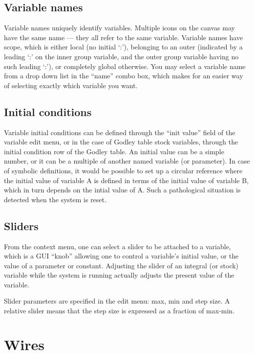 \subsection{Variable names}

Variable names uniquely identify variables. Multiple icons on the
canvas may have the same name --- they all refer to the same
variable. Variable names have scope, which is either local (no initial
`:'), belonging to an outer  (indicated by a leading `:' on the
inner group variable, and the outer group variable having no such
leading `:'), or completely global otherwise. You may select a
variable name from a drop down list in the ``name'' combo box, which
makes for an easier way of selecting exactly which variable you want.

\subsection{Initial conditions}\label{var:init}

Variable initial conditions can be defined through the ``init value''
field of the variable edit menu, or in the case of Godley table stock
variables, through the initial condition row of the Godley table. An
initial value can be a simple number, or it can be a multiple of
another named variable (or parameter). In case of symbolic
definitions, it would be possible to set up a circular reference where
the initial value of variable A is defined in terms of the initial
value of variable B, which in turn depends on the intial value of
A. Such a pathological situation is detected when the system is reset.

\subsection{Sliders}

From the context menu, one can select a slider to be attached to a
variable, which is a GUI ``knob'' allowing one to control a variable's
initial value, or the value of a parameter or constant. Adjusting the
slider of an integral (or stock) variable while the system is running
actually adjusts the present value of the variable.

Slider parameters are specified in the edit menu: max, min and step
size. A relative slider means that the step size is expressed as a
fraction of max-min.

\section{Wires}

